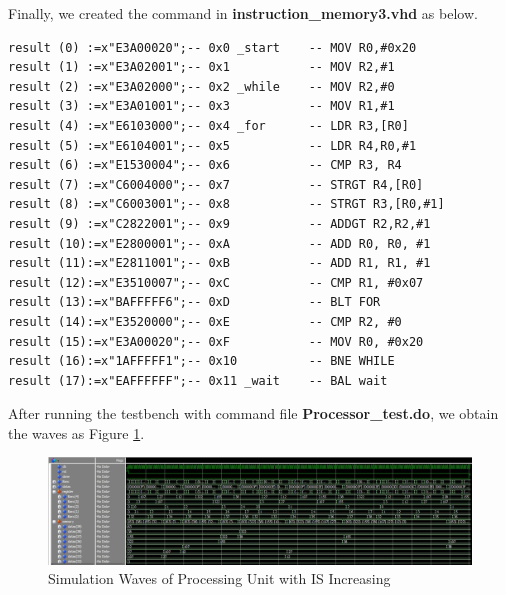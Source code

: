 Finally, we created the command in \textbf{instruction\_memory3.vhd} as below.
\begin{lstlisting}[style=vhdl, columns=fixed]
result (0) :=x"E3A00020";-- 0x0 _start    -- MOV R0,#0x20
result (1) :=x"E3A02001";-- 0x1	          -- MOV R2,#1
result (2) :=x"E3A02000";-- 0x2 _while    -- MOV R2,#0
result (3) :=x"E3A01001";-- 0x3		      -- MOV R1,#1
result (4) :=x"E6103000";-- 0x4 _for      -- LDR R3,[R0]
result (5) :=x"E6104001";-- 0x5	    	  -- LDR R4,R0,#1
result (6) :=x"E1530004";-- 0x6		      -- CMP R3, R4
result (7) :=x"C6004000";-- 0x7	    	  -- STRGT R4,[R0]
result (8) :=x"C6003001";-- 0x8	    	  -- STRGT R3,[R0,#1]
result (9) :=x"C2822001";-- 0x9		      -- ADDGT R2,R2,#1
result (10):=x"E2800001";-- 0xA           -- ADD R0, R0, #1
result (11):=x"E2811001";-- 0xB           -- ADD R1, R1, #1
result (12):=x"E3510007";-- 0xC           -- CMP R1, #0x07
result (13):=x"BAFFFFF6";-- 0xD           -- BLT FOR
result (14):=x"E3520000";-- 0xE           -- CMP R2, #0
result (15):=x"E3A00020";-- 0xF           -- MOV R0, #0x20
result (16):=x"1AFFFFF1";-- 0x10          -- BNE WHILE        
result (17):=x"EAFFFFFF";-- 0x11 _wait    -- BAL wait	     
\end{lstlisting}

After running the testbench with command file \textbf{Processor\_test.do}, we obtain the waves as Figure \ref{fig:PUEXres}.
\begin{figure}[htp]
    \centering
    \includegraphics[width=1\textwidth]{picture/PUEXres.jpg}
    \caption{Simulation Waves of Processing Unit with IS Increasing}     
    \label{fig:PUEXres}
\end{figure}








